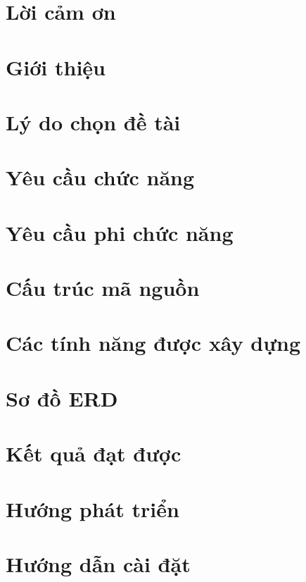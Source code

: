 \documentclass[a4paper,12pt]{report}
\begin{document}


\newpage

\tableofcontents %

\newpage

\chapter{Lời cảm ơn}\label{sec:thanks}


\chapter{Giới thiệu}\label{sec:introduction}


\chapter{Lý do chọn đề tài}\label{sec:reason}


\chapter{Yêu cầu chức năng}\label{sec:functional-requirements}


\chapter{Yêu cầu phi chức năng}\label{sec:non-functional-requirements}



\chapter{Cấu trúc mã nguồn}


\chapter{Các tính năng được xây dựng}


\chapter{Sơ đồ ERD}


\chapter{Kết quả đạt được}


\chapter{Hướng phát triển}


\chapter{Hướng dẫn cài đặt}

\end{document}
